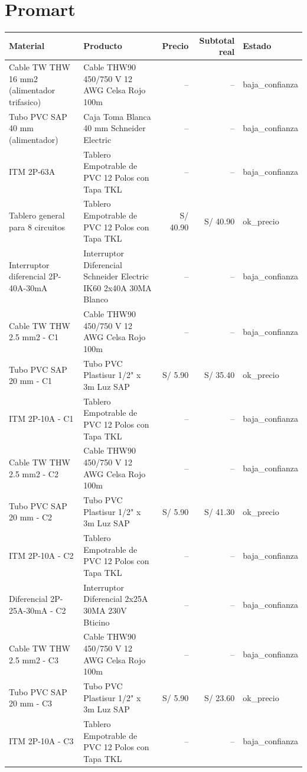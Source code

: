 \documentclass[11pt,a4paper]{article}
\begin{document}
\section{Promart}
\begin{longtable}{p{} p{} r r p{}}
\toprule Material & Producto & Precio & Subtotal real & Estado \\ \midrule\endhead
Cable TW THW 16 mm2 (alimentador trifasico) & Cable THW90 450/750 V 12 AWG Celsa Rojo 100m & -- & -- & baja\_confianza \\
Tubo PVC SAP 40 mm (alimentador) & Caja Toma Blanca 40 mm Schneider Electric & -- & -- & baja\_confianza \\
ITM 2P-63A & Tablero Empotrable de PVC 12 Polos con Tapa TKL & -- & -- & baja\_confianza \\
Tablero general para 8 circuitos & Tablero Empotrable de PVC 12 Polos con Tapa TKL & S/ 40.90 & S/ 40.90 & ok\_precio \\
Interruptor diferencial 2P-40A-30mA & Interruptor Diferencial Schneider Electric IK60 2x40A 30MA Blanco & -- & -- & baja\_confianza \\
Cable TW THW 2.5 mm2 - C1 & Cable THW90 450/750 V 12 AWG Celsa Rojo 100m & -- & -- & baja\_confianza \\
Tubo PVC SAP 20 mm - C1 & Tubo PVC Plastisur 1/2" x 3m Luz SAP & S/ 5.90 & S/ 35.40 & ok\_precio \\
ITM 2P-10A - C1 & Tablero Empotrable de PVC 12 Polos con Tapa TKL & -- & -- & baja\_confianza \\
Cable TW THW 2.5 mm2 - C2 & Cable THW90 450/750 V 12 AWG Celsa Rojo 100m & -- & -- & baja\_confianza \\
Tubo PVC SAP 20 mm - C2 & Tubo PVC Plastisur 1/2" x 3m Luz SAP & S/ 5.90 & S/ 41.30 & ok\_precio \\
ITM 2P-10A - C2 & Tablero Empotrable de PVC 12 Polos con Tapa TKL & -- & -- & baja\_confianza \\
Diferencial 2P-25A-30mA - C2 & Interruptor Diferencial 2x25A 30MA 230V Bticino & -- & -- & baja\_confianza \\
Cable TW THW 2.5 mm2 - C3 & Cable THW90 450/750 V 12 AWG Celsa Rojo 100m & -- & -- & baja\_confianza \\
Tubo PVC SAP 20 mm - C3 & Tubo PVC Plastisur 1/2" x 3m Luz SAP & S/ 5.90 & S/ 23.60 & ok\_precio \\
ITM 2P-10A - C3 & Tablero Empotrable de PVC 12 Polos con Tapa TKL & -- & -- & baja\_confianza \\

\end{longtable}
\end{document}
